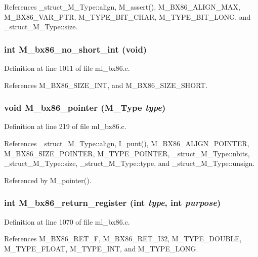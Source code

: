 References \_\-struct\_\-M\_\-Type::align, M\_\-assert(), M\_\-BX86\_\-ALIGN\_\-MAX, M\_\-BX86\_\-VAR\_\-PTR, M\_\-TYPE\_\-BIT\_\-CHAR, M\_\-TYPE\_\-BIT\_\-LONG, and \_\-struct\_\-M\_\-Type::size.
\subsubsection{\setlength{\rightskip}{0pt plus 5cm}int M\_\-bx86\_\-no\_\-short\_\-int (void)}\label{ml__bx86_8c_12c526db476cda00f5443441116bce1b}




Definition at line 1011 of file ml\_\-bx86.c.

References M\_\-BX86\_\-SIZE\_\-INT, and M\_\-BX86\_\-SIZE\_\-SHORT.
\subsubsection{\setlength{\rightskip}{0pt plus 5cm}void M\_\-bx86\_\-pointer (\bf{M\_\-Type} {\em type})}\label{ml__bx86_8c_563522254ad79091df4e089c239a47fb}




Definition at line 219 of file ml\_\-bx86.c.

References \_\-struct\_\-M\_\-Type::align, I\_\-punt(), M\_\-BX86\_\-ALIGN\_\-POINTER, M\_\-BX86\_\-SIZE\_\-POINTER, M\_\-TYPE\_\-POINTER, \_\-struct\_\-M\_\-Type::nbits, \_\-struct\_\-M\_\-Type::size, \_\-struct\_\-M\_\-Type::type, and \_\-struct\_\-M\_\-Type::unsign.

Referenced by M\_\-pointer().
\subsubsection{\setlength{\rightskip}{0pt plus 5cm}int M\_\-bx86\_\-return\_\-register (int {\em type}, int {\em purpose})}\label{ml__bx86_8c_30d3e4d3819307a36b1b4df5e7e64c02}




Definition at line 1070 of file ml\_\-bx86.c.

References M\_\-BX86\_\-RET\_\-F, M\_\-BX86\_\-RET\_\-I32, M\_\-TYPE\_\-DOUBLE, M\_\-TYPE\_\-FLOAT, M\_\-TYPE\_\-INT, and M\_\-TYPE\_\-LONG.
